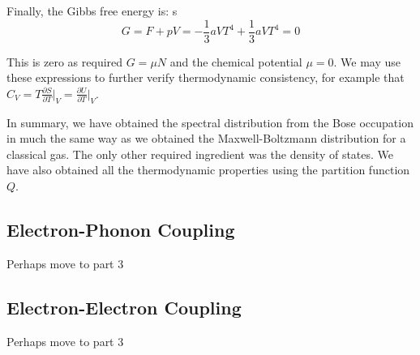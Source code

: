 \documentclass[book.tex]{subfiles}
\begin{document}
Finally, the Gibbs free energy is:
 s \textbf{  }
\begin{equation}\label{Eq47}
G = F + pV =  - \frac{1}{3} aVT^{4} + \frac{1}{3} aVT^{4} = 0
\end{equation}

This is zero as required $G=\mu N$ and the chemical potential $\mu=0$. We may use these expressions to further verify thermodynamic consistency, for example that $C_{V} = T\frac{\partial S}{\partial T}\bigg|_{V}= \frac{\partial U}{\partial T}\bigg|_{V}$.

In summary, we have obtained the spectral distribution from the Bose occupation in much the same way as we obtained the Maxwell-Boltzmann distribution for a classical gas. The only other required ingredient was the density of states. We have also obtained all the thermodynamic properties using the partition function $Q$.

\subsection{Electron-Phonon Coupling}
Perhaps move to part 3
\subsection{Electron-Electron Coupling}
Perhaps move to part 3
\end{document}
